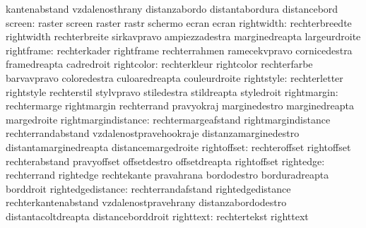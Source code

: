                            kantenabstand             vzdalenosthrany
                           distanzabordo             distantabordura
                           distancebord
                   screen: raster                    screen
                           raster                    rastr
                           schermo                   ecran
                           ecran
               rightwidth: rechterbreedte            rightwidth
                           rechterbreite             sirkavpravo
                           ampiezzadestra            marginedreapta
                           largeurdroite
               rightframe: rechterkader              rightframe
                           rechterrahmen             ramecekvpravo
                           cornicedestra             framedreapta
                           cadredroit
               rightcolor: rechterkleur              rightcolor
                           rechterfarbe              barvavpravo
                           coloredestra              culoaredreapta
                           couleurdroite
               rightstyle: rechterletter             rightstyle
                           rechterstil               stylvpravo
                           stiledestra               stildreapta
                           styledroit
              rightmargin: rechtermarge              rightmargin
                           rechterrand               pravyokraj
                           marginedestro             marginedreapta
                           margedroite
      rightmargindistance: rechtermargeafstand       rightmargindistance
                           rechterrandabstand        vzdalenostpravehookraje
                           distanzamarginedestro     distantamarginedreapta
                           distancemargedroite
              rightoffset: rechteroffset             rightoffset
                           rechterabstand            pravyoffset
                           offsetdestro              offsetdreapta
                           rightoffset
                rightedge: rechterrand               rightedge
                           rechtekante               pravahrana
                           bordodestro               borduradreapta
                           borddroit
        rightedgedistance: rechterrandafstand        rightedgedistance
                           rechterkantenabstand      vzdalenostpravehrany
                           distanzabordodestro       distantacoltdreapta
                           distanceborddroit
                righttext: rechtertekst              righttext
